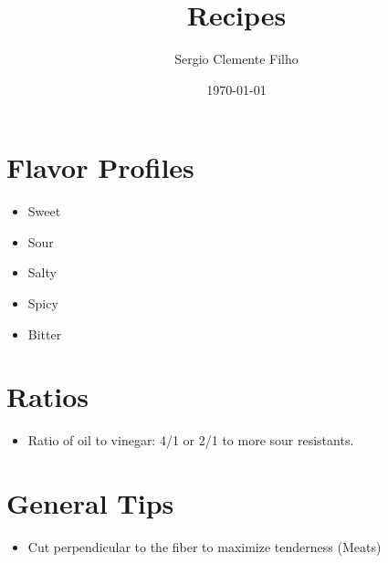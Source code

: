 \documentclass{article}
\title{Recipes}
\author{Sergio Clemente Filho}
\date{\today}
\begin{document}
\maketitle

\newpage

\tableofcontents{}

\newpage

\section{Flavor Profiles}
\begin{itemize}
	\item Sweet
	\item Sour
	\item Salty
	\item Spicy
	\item Bitter
\end{itemize}

	\section{Ratios}
\begin{itemize}
	\item Ratio of oil to vinegar: 4/1 or 2/1 to more sour resistants.
\end{itemize}

\section{General Tips}
\begin{itemize}
	\item Cut perpendicular to the fiber to maximize tenderness (Meats)
\end{itemize}
\end{document}
